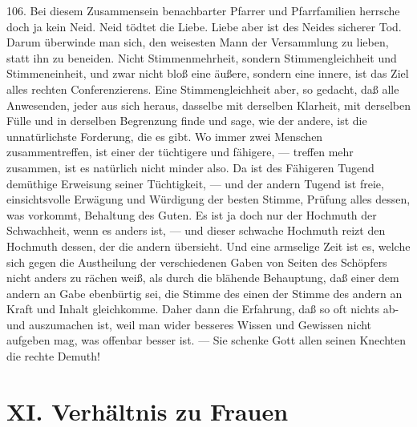 106. Bei diesem Zusammensein benachbarter Pfarrer und Pfarrfamilien herrsche doch ja kein Neid. Neid tödtet die Liebe. Liebe aber ist des Neides sicherer Tod. Darum überwinde man sich, den weisesten Mann der Versammlung zu lieben, statt ihn zu beneiden. Nicht Stimmenmehrheit, sondern Stimmengleichheit und Stimmeneinheit, und zwar nicht bloß eine äußere, sondern eine innere, ist das Ziel alles rechten Conferenzierens. Eine Stimmengleichheit aber, so gedacht, daß alle Anwesenden, jeder aus sich heraus, dasselbe mit derselben Klarheit, mit derselben Fülle und in derselben Begrenzung finde und sage, wie der andere, ist die unnatürlichste Forderung, die es gibt. Wo immer zwei Menschen zusammentreffen, ist einer der tüchtigere und fähigere, — treffen mehr zusammen, ist es natürlich nicht minder also. Da ist des Fähigeren Tugend demüthige Erweisung seiner Tüchtigkeit, — und der andern Tugend ist freie, einsichtsvolle Erwägung und Würdigung der besten Stimme, Prüfung alles dessen, was vorkommt, Behaltung des Guten. Es ist ja doch nur der Hochmuth der Schwachheit, wenn es anders ist, — und dieser schwache Hochmuth reizt den Hochmuth dessen, der die andern übersieht. Und eine armselige Zeit ist es, welche sich gegen die Austheilung der verschiedenen Gaben von Seiten des Schöpfers nicht anders zu rächen weiß, als durch die blähende Behauptung, daß einer dem andern an Gabe ebenbürtig sei, die Stimme des einen der Stimme des
andern an Kraft und Inhalt gleichkomme. Daher dann die Erfahrung, daß so oft nichts ab- und auszumachen ist, weil man wider besseres Wissen und Gewissen nicht aufgeben mag, was offenbar besser ist. — Sie schenke Gott allen seinen Knechten die rechte Demuth!

\section{XI. Verhältnis zu Frauen}

